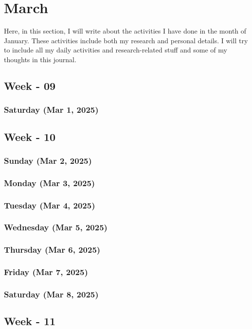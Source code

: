\chapter{March}
\label{chap:March}
\hspace{1cm}
Here, in this section, I will write about the activities I have done in the month of January\cite{zhou2015}. These activities include both my research and personal details. I will try to include all my daily activities and research-related stuff and some of my thoughts in this journal.

\section{Week - 09}
\subsection*{Saturday (Mar 1, 2025)}
\section{Week - 10}
\subsection*{Sunday (Mar 2, 2025)}
\subsection*{Monday (Mar 3, 2025)}
\subsection*{Tuesday (Mar 4, 2025)}
\subsection*{Wednesday (Mar 5, 2025)}
\subsection*{Thursday (Mar 6, 2025)}
\subsection*{Friday (Mar 7, 2025)}
\subsection*{Saturday (Mar 8, 2025)}

\section{Week - 11}
